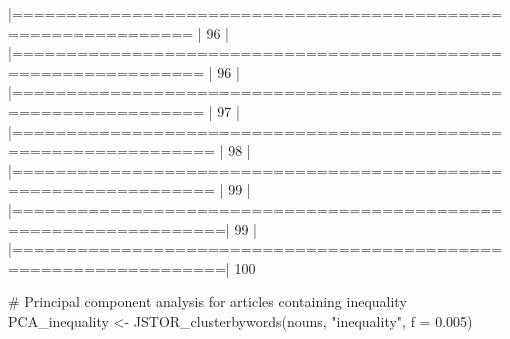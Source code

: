 \documentclass[10pt]{article}
\newenvironment{CodeChunk}{}{}
\begin{document}
\begin{CodeChunk}
\begin{CodeChunk}
\begin{CodeOutput}
  |==============================================================   |  96%
  |                                                                       
  |===============================================================  |  96%
  |                                                                       
  |===============================================================  |  97%
  |                                                                       
  |================================================================ |  98%
  |                                                                       
  |================================================================ |  99%
  |                                                                       
  |=================================================================|  99%
  |                                                                       
  |=================================================================| 100%
\end{CodeOutput}
\begin{CodeInput}
# Principal component analysis for articles containing inequality
PCA_inequality <- JSTOR_clusterbywords(nouns, "inequality", f = 0.005)
\end{CodeInput}


\end{CodeChunk}
\end{CodeChunk}
\end{document}
